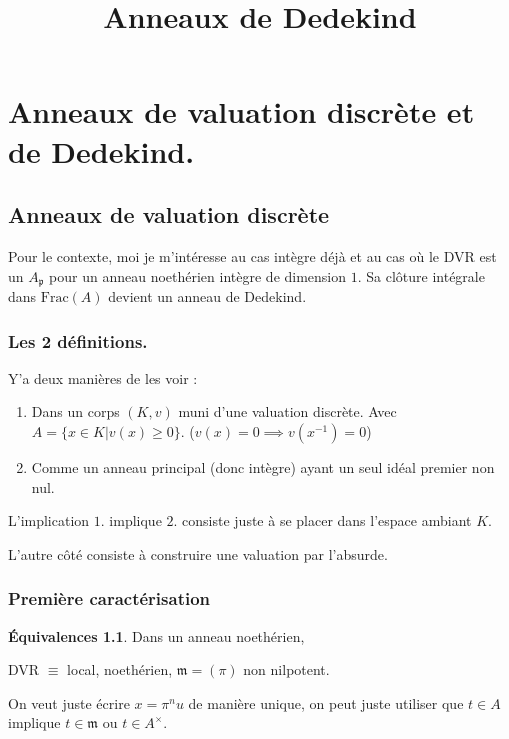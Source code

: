 \documentclass[a4paper,12pt]{book}
\title{Anneaux de Dedekind}
\date{}
\newcommand{\m}{\mathfrak m}
\newcommand{\p}{\mathfrak p}
\newcommand{\Frac}{\textrm{Frac}}
\theoremstyle{plain}
\theoremstyle{definition}
\newtheorem*{eq}{Équivalences}
\theoremstyle{remark}
\begin{document}
\maketitle

\chapter{Anneaux de valuation discrète et de Dedekind.}
\section{Anneaux de valuation discrète}
Pour le contexte, moi je m'intéresse au cas intègre déjà et
au cas où le DVR est un $A_\p$ pour un anneau noethérien intègre
de dimension $1$. Sa clôture intégrale dans $\Frac(A)$ devient
un anneau de Dedekind.
\subsection{Les 2 définitions.}
Y'a deux manières de les voir :
\begin{enumerate}
    \item Dans un corps $(K,v)$ muni d'une valuation discrète.
	Avec $A=\{x\in K|v(x)\geq 0\}$. 
	($v(x)=0\implies v(x^{-1})=0$)
    \item Comme un anneau principal (donc intègre) ayant un seul
	idéal premier non nul.
\end{enumerate}
L'implication $1.$ implique $2.$ consiste juste à se placer
dans l'espace ambiant $K$.

L'autre côté consiste à construire une valuation par l'absurde.

\subsection{Première caractérisation}
\begin{eq}
    Dans un anneau noethérien, 
    \begin{center}
	DVR $\equiv$ local, noethérien, $\m=(\pi)$ non nilpotent.
    \end{center}
\end{eq}
On veut juste écrire $x=\pi^n u$ de manière unique, on peut juste
utiliser que $t\in A$ implique $t\in \m$ ou $t\in A^\times$.
\end{document}

